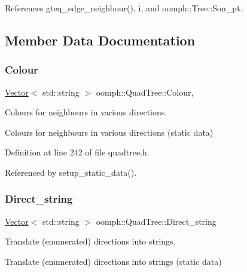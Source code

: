 References gteq\+\_\+edge\+\_\+neighbour(), i, and oomph\+::\+Tree\+::\+Son\+\_\+pt.



\subsection{Member Data Documentation}
\mbox{\label{classoomph_1_1QuadTree_ab882ad3e12fec441f97ef526bae1f497}} 
\subsubsection{\texorpdfstring{Colour}{Colour}}
{\footnotesize\ttfamily \hyperlink{classoomph_1_1Vector}{Vector}$<$ std\+::string $>$ oomph\+::\+Quad\+Tree\+::\+Colour\hspace{0.3cm}{\ttfamily [static]}, {\ttfamily [private]}}



Colours for neighbours in various directions. 

Colours for neighbours in various directions (static data) 

Definition at line 242 of file quadtree.\+h.



Referenced by setup\+\_\+static\+\_\+data().

\mbox{\label{classoomph_1_1QuadTree_a1b8f4dd684238115e0c4de4860187e4a}} 
\subsubsection{\texorpdfstring{Direct\+\_\+string}{Direct\_string}}
{\footnotesize\ttfamily \hyperlink{classoomph_1_1Vector}{Vector}$<$ std\+::string $>$ oomph\+::\+Quad\+Tree\+::\+Direct\+\_\+string\hspace{0.3cm}{\ttfamily [static]}}



Translate (enumerated) directions into strings. 

Translate (enumerated) directions into strings (static data) 

